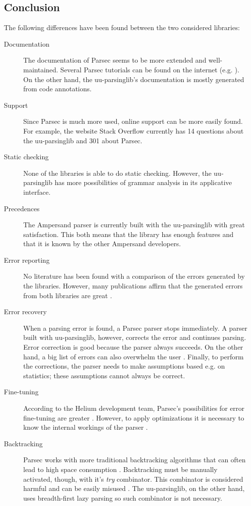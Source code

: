 \subsection{Conclusion}
The following differences have been found between the two considered libraries:
\begin{description}
	\item[Documentation] The documentation of Parsec seems to be more extended and well-maintained.
		Several Parsec tutorials can be found on the internet (e.g. ).
		On the other hand, the uu-parsinglib's documentation is mostly generated from code annotations.
	\item[Support] Since Parsec is much more used, online support can be more easily found.
		For example, the website Stack Overflow currently has 14 questions about the uu-parsinglib and 301 about Parsec.
	\item[Static checking] None of the libraries is able to do static checking.
		However, the uu-parsinglib has more possibilities of grammar analysis in its applicative interface.
	\item[Precedences] The Ampersand parser is currently built with the uu-parsinglib with great satisfaction.
		This both means that the library has enough features and that it is known by the other Ampersand developers.
	\item[Error reporting] No literature has been found with a comparison of the errors generated by the libraries.
		However, many publications affirm that the generated errors from both libraries are great .
	\item[Error recovery] When a parsing error is found, a Parsec parser stops immediately.
		A parser built with uu-parsinglib, however, corrects the error and continues parsing.
		Error correction is good because the parser always succeeds.
		On the other hand, a big list of errors can also overwhelm the user .
		Finally, to perform the corrections, the parser needs to make assumptions based e.g. on statistics;
		these assumptions cannot always be correct.
	\item[Fine-tuning] According to the Helium development team, Parsec's possibilities for error fine-tuning are greater .
		However, to apply optimizations it is necessary to know the internal workings of the parser .
	\item[Backtracking] Parsec works with more traditional backtracking algorithms  that can often lead to high space consumption .
		Backtracking must be manually activated, though, with it's \textit{try} combinator.
    This combinator is considered harmful and can be easily misused .
		The uu-parsinglib, on the other hand, uses breadth-first lazy parsing  so such combinator is not necessary.
    

\end{description}
